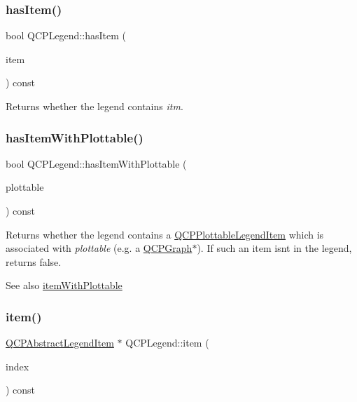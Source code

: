\subsubsection{\texorpdfstring{has\+Item()}{hasItem()}}
{\footnotesize\ttfamily bool Q\+C\+P\+Legend\+::has\+Item (\begin{DoxyParamCaption}\item[{\hyperlink{class_q_c_p_abstract_legend_item}{Q\+C\+P\+Abstract\+Legend\+Item} $\ast$}]{item }\end{DoxyParamCaption}) const}

Returns whether the legend contains {\itshape itm}. \hypertarget{class_q_c_p_legend_a4b90a442af871582df85c2bc13f91e88}{}\label{class_q_c_p_legend_a4b90a442af871582df85c2bc13f91e88} 
\subsubsection{\texorpdfstring{has\+Item\+With\+Plottable()}{hasItemWithPlottable()}}
{\footnotesize\ttfamily bool Q\+C\+P\+Legend\+::has\+Item\+With\+Plottable (\begin{DoxyParamCaption}\item[{const \hyperlink{class_q_c_p_abstract_plottable}{Q\+C\+P\+Abstract\+Plottable} $\ast$}]{plottable }\end{DoxyParamCaption}) const}

Returns whether the legend contains a \hyperlink{class_q_c_p_plottable_legend_item}{Q\+C\+P\+Plottable\+Legend\+Item} which is associated with {\itshape plottable} (e.\+g. a \hyperlink{class_q_c_p_graph}{Q\+C\+P\+Graph}$\ast$). If such an item isn\textquotesingle{}t in the legend, returns false.

\begin{DoxySeeAlso}{See also}
\hyperlink{class_q_c_p_legend_a91e790002d8bf15a20628a8e8841e397}{item\+With\+Plottable} 
\end{DoxySeeAlso}
\hypertarget{class_q_c_p_legend_acfe9694c45104a3359d3806ed366fcf7}{}\label{class_q_c_p_legend_acfe9694c45104a3359d3806ed366fcf7} 
\subsubsection{\texorpdfstring{item()}{item()}}
{\footnotesize\ttfamily \hyperlink{class_q_c_p_abstract_legend_item}{Q\+C\+P\+Abstract\+Legend\+Item} $\ast$ Q\+C\+P\+Legend\+::item (\begin{DoxyParamCaption}\item[{int}]{index }\end{DoxyParamCaption}) const}

